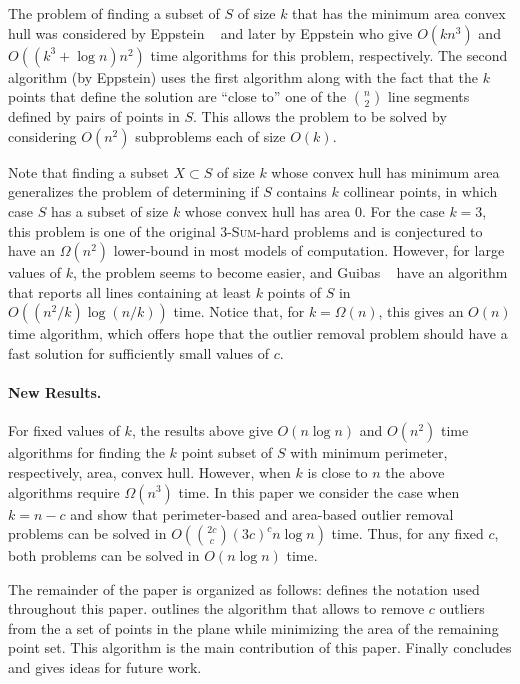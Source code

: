 \documentclass[lotsofwhite]{patmorin}
\newcommand{\runtime}{{2c\choose c}(3c)^c n\log n}
\begin{document}
The problem of finding a subset of $S$ of size $k$ that has the
minimum area convex hull was considered by Eppstein \etal\
\cite{eorw92} and later by Eppstein \cite{e93} who give $O(kn^{3})$
and $O((k^3+\log n) n^2)$ time algorithms for this problem,
respectively.  The second algorithm (by Eppstein) uses the first
algorithm along with the fact that the $k$ points that define the
solution are ``close to'' one of the $n\choose 2$ line segments
defined by pairs of points in $S$.  This allows the problem to be
solved by considering $O(n^2)$ subproblems each of size $O(k)$.

Note that finding a subset $X\subset S$ of size $k$ whose convex hull
has minimum area generalizes the problem of determining if $S$
contains $k$ collinear points, in which case $S$ has a subset of size
$k$ whose convex hull has area 0.  For the case $k=3$, this problem is
one of the original \textsc{3-Sum}-hard problems \cite{X} and is
conjectured to have an $\Omega(n^2)$ lower-bound in most models of
computation. However, for large values of $k$, the problem seems to
become easier, and Guibas \etal\ \cite{go} have an algorithm that
reports all lines containing at least $k$ points of $S$ in
$O((n^2/k)\log(n/k))$ time.  Notice that, for $k=\Omega(n)$, this gives
an $O(n)$ time algorithm, which offers hope that the outlier removal
problem should have a fast solution for sufficiently small values of
$c$.

\paragraph{New Results.}

For fixed values of $k$, the results above give $O(n\log n)$ and
$O(n^2)$ time algorithms for finding the $k$ point subset of $S$ with
minimum perimeter, respectively, area, convex hull.  However, when $k$
is close to $n$ the above algorithms require $\Omega(n^3)$ time.  In
this paper we consider the case when $k=n-c$ and show that
perimeter-based and area-based outlier removal problems can be solved
in $O(\runtime)$ time.  Thus, for any fixed $c$, both problems can be
solved in $O(n\log n)$ time.

The remainder of the paper is organized as follows:  
defines the notation used throughout this paper. \secref{algorithm} outlines 
the algorithm that allows to remove $c$ outliers from the a set of points in 
the plane while minimizing the area of the remaining point set. This algorithm 
is the main contribution of this paper. Finally \secref{conclusions} concludes 
and gives ideas for future work.
 
\end{document}
